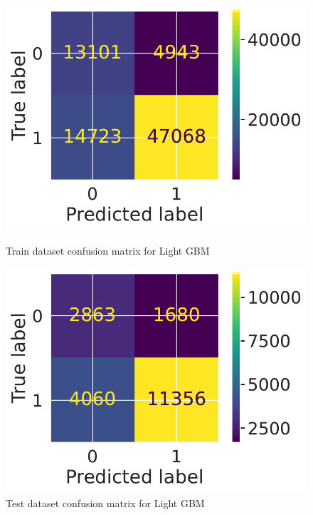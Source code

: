 \documentclass[12pt]{article}
\begin{document}
\begin{figure}
\centering
    \begin{minipage}{0.45\textwidth}
      \centering
      \includegraphics[width=.9\linewidth]{images/lightgbm_confusion_matrix_train.pdf}
      \caption{Train dataset confusion matrix for Light GBM}
      \label{fig:cm_lightgbm_train}
    \end{minipage} \hfill
    \begin{minipage}{0.45\textwidth}
      \centering
      \includegraphics[width=.9\linewidth]{images/lightgbm_confusion_matrix_test.pdf}
      \caption{Test dataset confusion matrix for Light GBM}
      \label{fig:cm_lightgbm_test}
    \end{minipage}
\end{figure}
\end{document}
